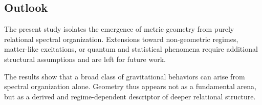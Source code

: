 \subsection{Outlook}
  \label{subsec:outlook}

  The present study isolates the emergence of metric geometry from
  purely relational spectral organization.
  Extensions toward non-geometric regimes, matter-like excitations,
  or quantum and statistical phenomena require additional structural
  assumptions and are left for future work.

  The results show that a broad class of gravitational behaviors
  can arise from spectral organization alone.
  Geometry thus appears not as a fundamental arena,
  but as a derived and regime-dependent descriptor
  of deeper relational structure.

